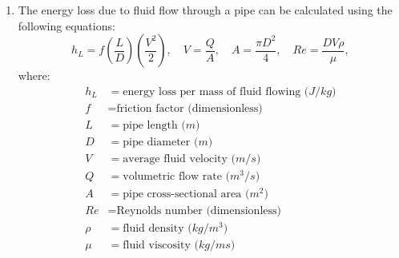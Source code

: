 {\begin{minipage}{\linewidth}
\begin{enumerate}
\item The energy loss due to fluid flow through a pipe can be calculated using the following equations:
\begin{equation*}
h_L = f \left( \frac{L}{D} \right) \left( \frac{V^2}{2} \right), \quad
V = \frac{Q}{A}, \quad
A = \frac{\pi D^2}{4}, \quad
Re = \frac{DV\rho}{\mu},
\end{equation*}
where:
\begin{align*}
h_L &= \textrm{energy loss per mass of fluid flowing ($J/kg$)} \\
f &= \textrm{friction factor (dimensionless)} \\
L &= \textrm{pipe length ($m$)} \\
D &= \textrm{pipe diameter ($m$)} \\
V &= \textrm{average fluid velocity ($m/s$)} \\
Q &= \textrm{volumetric flow rate ($m^3/s$)} \\
A &= \textrm{pipe cross-sectional area ($m^2$)} \\
Re &= \textrm{Reynolds number (dimensionless)} \\
\rho &= \textrm{fluid density ($kg/m^3$)} \\
\mu &= \textrm{fluid viscosity ($kg/ms$)}
\end{align*}
\end{enumerate}
\end{minipage}
}\\
\addtolength{\parindent}{4mm}

